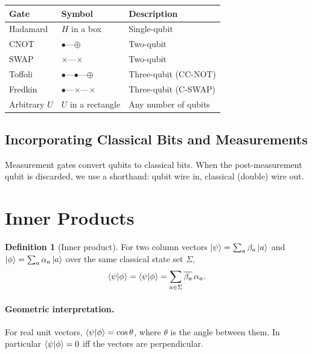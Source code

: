 \documentclass[11pt]{article}
\theoremstyle{definition}
\newtheorem{definition}{Definition}[section]
\begin{document}
\begin{center}
\begin{tabular}{lll}
\hline
\textbf{Gate} & \textbf{Symbol} & \textbf{Description} \\\hline
Hadamard & $H$ in a box & Single-qubit \\
CNOT & $\bullet$---$\oplus$ & Two-qubit \\
SWAP & $\times$---$\times$ & Two-qubit \\
Toffoli & $\bullet$---$\bullet$---$\oplus$ & Three-qubit (CC-NOT) \\
Fredkin & $\bullet$---$\times$---$\times$ & Three-qubit (C-SWAP) \\
Arbitrary $U$ & $U$ in a rectangle & Any number of qubits \\
\hline
\end{tabular}
\end{center}

\subsection{Incorporating Classical Bits and Measurements}

Measurement gates convert qubits to classical bits.  When the post-measurement qubit is discarded, we use a shorthand: qubit wire in, classical (double) wire out.

\section{Inner Products}

\begin{definition}[Inner product]
For two column vectors $\ket{\psi}=\sum_a \beta_a\ket{a}$ and $\ket{\phi}=\sum_a \alpha_a\ket{a}$ over the same classical state set $\Sigma$,
\[
    \braket{\psi}{\phi}
    = \bra{\psi}\ket{\phi}
    = \sum_{a\in\Sigma}\overline{\beta_a}\,\alpha_a.
\]
\end{definition}

\paragraph{Geometric interpretation.}  For real unit vectors, $\braket{\psi}{\phi}=\cos\theta$, where $\theta$ is the angle between them.  In particular $\braket{\psi}{\phi}=0$ iff the vectors are perpendicular.
\end{document}
